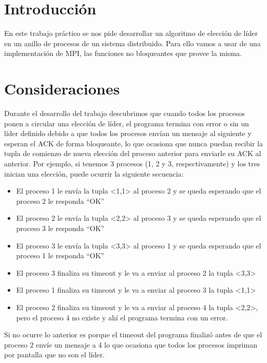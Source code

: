 \documentclass[hidelinks,a4paper,12pt, nofootinbib]{article}
\begin{document}
\maketitle
\tableofcontents
\newpage

\section{Introducción}
En este trabajo práctico se nos pide desarrollar un algoritmo de elección de líder en un anillo de procesos de un sistema distribuido. Para ello vamos a usar de una implementación de MPI, las funciones no bloqueantes que provee la misma.

\section{Consideraciones}
Durante el desarrollo del trabajo descubrimos que cuando todos los procesos ponen a circular una elección de líder, el programa termina con error o sin un líder definido debido a que todos los procesos envían un mensaje al siguiente y esperan el ACK de forma bloqueante, lo que ocasiona que nunca puedan recibir la tupla de comienzo de nueva elección del proceso anterior para enviarle su ACK al anterior. Por ejemplo, si tenemos 3 procesos (1, 2 y 3, respectivamente) y los tres inician una elección, puede ocurrir la siguiente secuencia:
\begin{itemize}
	\item El proceso 1 le envía la tupla <1,1> al proceso 2 y se queda esperando que el proceso 2 le responda ``OK''
	\item El proceso 2 le envía la tupla <2,2> al proceso 3 y se queda esperando que el proceso 3 le responda ``OK''
	\item El proceso 3 le envía la tupla <3,3> al proceso 1 y se queda esperando que el proceso 1 le responda ``OK''
	\item El proceso 3 finaliza su timeout y le va a enviar al proceso 2 la tupla <3,3>
	\item El proceso 1 finaliza su timeout y le va a enviar al proceso 3 la tupla <1,1>
	\item El proceso 2 finaliza su timeout y le va a enviar al proceso 4 la tupla <2,2>, pero el proceso 4 no existe y ahí el programa termina con un error.
\end{itemize}

Si no ocurre lo anterior es porque el timeout del programa finalizó antes de que el proceso 2 envíe un mensaje a 4 lo que ocasiona que todos los procesos impriman por pantalla que no son el líder. \\
\end{document}
